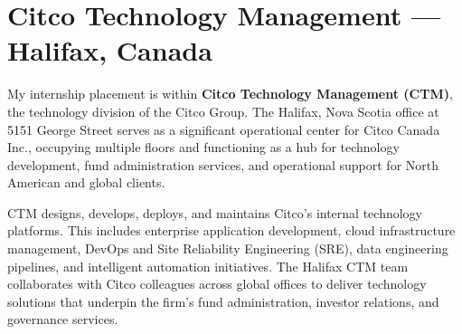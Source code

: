 \FloatBarrier

\section{Citco Technology Management --- Halifax, Canada}

My internship placement is within \textbf{Citco Technology Management (CTM)}, the technology division of the Citco Group. The Halifax, Nova Scotia office at 5151 George Street serves as a significant operational center for Citco Canada Inc., occupying multiple floors and functioning as a hub for technology development, fund administration services, and operational support for North American and global clients.

CTM designs, develops, deploys, and maintains Citco's internal technology platforms. This includes enterprise application development, cloud infrastructure management, DevOps and Site Reliability Engineering (SRE), data engineering pipelines, and intelligent automation initiatives. The Halifax CTM team collaborates with Citco colleagues across global offices to deliver technology solutions that underpin the firm's fund administration, investor relations, and governance services.



